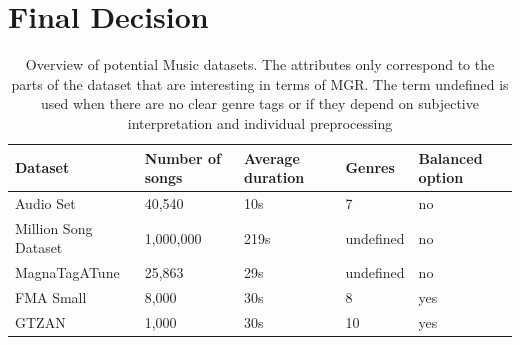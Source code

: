   \section{Final Decision}
    \begin{table}
      \begin{tabular}{|p{5cm}|p{2cm}|p{2cm}|p{2cm}|p{2cm}|}
        \hline
        \textbf{Dataset} & \textbf{Number of songs} & \textbf{Average duration} & \textbf{Genres} & \textbf{Balanced option} \\
        \hline
        Audio Set \cite{gemmeke2017} & 40,540 & 10s & 7 & no \\
        Million Song Dataset \cite{bertin2011million} & 1,000,000 & 219s & undefined & no \\
        MagnaTagATune \cite{law2009evaluation} & 25,863 & 29s & undefined & no \\
        FMA Small \cite{defferrard2016fma} & 8,000 & 30s & 8 & yes \\
        GTZAN \cite{tzanetakis2002musical} & 1,000 & 30s & 10 & yes \\
        \hline
      \end{tabular}
      \caption{Overview of potential Music datasets. The attributes only correspond to the parts of the dataset that are interesting in terms of \ac{MGR}. The term undefined is used when there are no clear genre tags or if they depend on subjective interpretation and individual preprocessing}
      \label{tab:music_datasets}
    \end{table}

